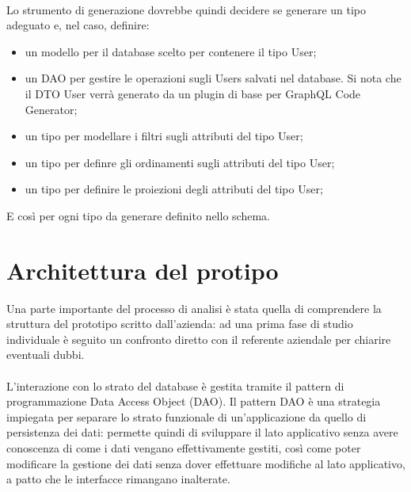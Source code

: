 \documentclass[a4paper, 12pt]{report}
\begin{document}
      \paragraph*{}
      Lo strumento di generazione dovrebbe quindi decidere se generare un tipo adeguato e, nel caso, definire:
      \begin{itemize}
        \item un modello per il database scelto per contenere il tipo User;
        \item un DAO per gestire le operazioni sugli Users salvati nel database. Si nota che il DTO User verrà generato da un plugin di base per GraphQL Code Generator;
        \item un tipo per modellare i filtri sugli attributi del tipo User;
        \item un tipo per definre gli ordinamenti sugli attributi del tipo User;
        \item un tipo per definire le proiezioni degli attributi del tipo User;
      \end{itemize}
      E così per ogni tipo da generare definito nello schema.
    \section{Architettura del protipo}
      Una parte importante del processo di analisi è stata quella di comprendere la struttura del prototipo scritto dall'azienda: ad una prima fase di studio individuale è seguito un confronto diretto con il referente aziendale per chiarire eventuali dubbi.
      \paragraph*{}
      L'interazione con lo strato del database è gestita tramite il pattern di programmazione Data Access Object (DAO).
      Il pattern DAO è una strategia impiegata per separare lo strato funzionale di un'applicazione da quello di persistenza dei dati: permette quindi di sviluppare il lato applicativo senza avere conoscenza di come i dati vengano effettivamente gestiti, così come poter modificare la gestione dei dati
      senza dover effettuare modifiche al lato applicativo, a patto che le interfacce rimangano inalterate.
\end{document}
